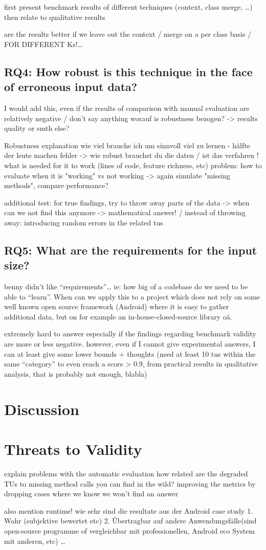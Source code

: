 first present benchmark results of different techniques (context, class merge, \ldots) then relate to qualitative results

are the results better if we leave out the context / merge on a per class basis / FOR DIFFERENT Ks!\ldots

\subsection{RQ4: How robust is this technique in the face of erroneous input data?}
I would add this, even if the results of comparison with manual evaluation are relatively negative / don't say anything
worauf is robustness bezogen? -> results quality or smth else?

Robustness explanation
    wie viel brauche ich um sinnvoll viel zu lernen - hälfte der leute machen fehler -> wie robust brauchst du die daten / ist das verfahren !
    what is needed for it to work (lines of code, feature richness, etc) 
    problem: how to evaluate when it is "working" vs not working -> again simulate "missing methods", compare performance?

additional test:
	for true findings, try to throw away parts of the data -> when can we not find this anymore -> mathematical answer!
    / instead of throwing away: introducing random errors in the related tus

\subsection{RQ5: What are the requirements for the input size?}
benny didn't like ``requirements''\ldots
ie: how big of a codebase do we need to be able to ``learn''. When can we apply this to a project which does not rely on some well known open source framework (Android) where it is easy to gather additional data, but on for example an in-house-closed-source library oä.

extremely hard to answer especially if the findings regarding benchmark validity are more or less negative.
however, even if I cannot give experimental answers, I can at least give some lower bounds + thoughts
(need at least 10 tus within the same ``category'' to even reach a score > 0.9, from practical results in qualitative analysis, that is probably not enough, blabla)

\section{Discussion}

\section{Threats to Validity}

explain problems with the automatic evaluation
how related are the degraded TUs to missing method calls you can find in the wild?
improving the metrics by dropping cases where we know we won't find an answer

also mention runtime!
wie sehr sind die resultate aus der Android case study 1. Wahr (subjektive bewertet etc) 2. Übertragbar auf andere Anwendungsfälle(sind open-source programme of vergleichbar mit professionellen, Android eco System mit anderen, etc)
\ldots
